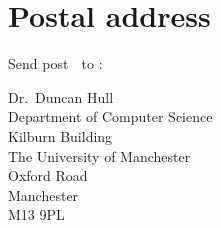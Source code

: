 \documentclass[12pt,]{book}
\begin{document}
\hypertarget{postal-address}{%
\section{Postal address}\label{postal-address}}

Send post 🐌 to :

Dr.~Duncan Hull\\
Department of Computer Science\\
Kilburn Building\\
The University of Manchester\\
Oxford Road\\
Manchester\\
M13 9PL


\end{document}
